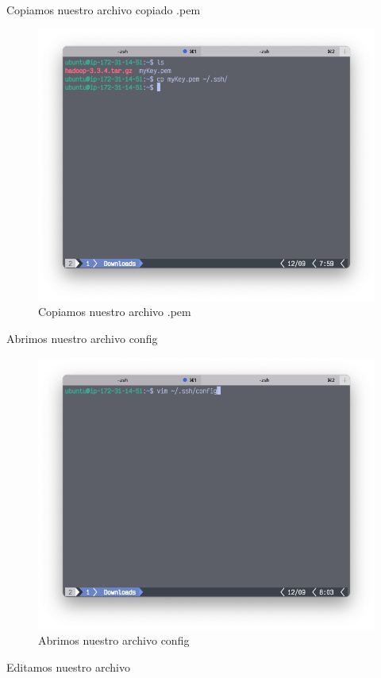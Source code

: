 Copiamos nuestro archivo copiado .pem
 \clearpage
\begin{figure}[h]
	\centering
	\includegraphics[scale=.35] {img/29-cp-pem-file}
	\caption{Copiamos nuestro archivo .pem}
	\label{fig:29}	
\end{figure}
Abrimos nuestro archivo config
\begin{figure}[h]
	\centering
	\includegraphics[scale=.35] {img/30-create-ssh-config}
	\caption{Abrimos nuestro archivo config}
	\label{fig:30}	
\end{figure}

Editamos nuestro archivo

